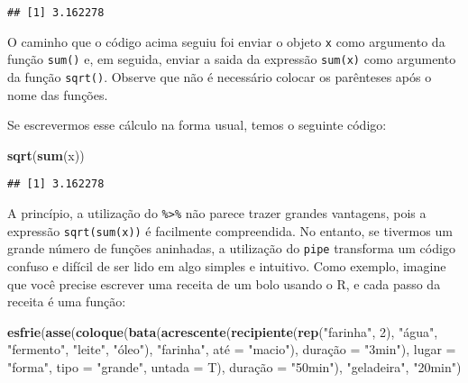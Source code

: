 \documentclass[]{book}
\newenvironment{Shaded}{\begin{snugshade}}{\end{snugshade}}
\newcommand{\KeywordTok}[1]{\textcolor[rgb]{0.13,0.29,0.53}{\textbf{{#1}}}}
\newcommand{\DataTypeTok}[1]{\textcolor[rgb]{0.13,0.29,0.53}{{#1}}}
\newcommand{\DecValTok}[1]{\textcolor[rgb]{0.00,0.00,0.81}{{#1}}}
\newcommand{\StringTok}[1]{\textcolor[rgb]{0.31,0.60,0.02}{{#1}}}
\newcommand{\NormalTok}[1]{{#1}}
\begin{document}
\begin{verbatim}
## [1] 3.162278
\end{verbatim}

O caminho que o código acima seguiu foi enviar o objeto \texttt{x} como
argumento da função \texttt{sum()} e, em seguida, enviar a saida da
expressão \texttt{sum(x)} como argumento da função \texttt{sqrt()}.
Observe que não é necessário colocar os parênteses após o nome das
funções.

Se escrevermos esse cálculo na forma usual, temos o seguinte código:

\begin{Shaded}
\begin{Highlighting}[]
\KeywordTok{sqrt}\NormalTok{(}\KeywordTok{sum}\NormalTok{(x))}
\end{Highlighting}
\end{Shaded}

\begin{verbatim}
## [1] 3.162278
\end{verbatim}

A princípio, a utilização do \texttt{\%\textgreater{}\%} não parece
trazer grandes vantagens, pois a expressão \texttt{sqrt(sum(x))} é
facilmente compreendida. No entanto, se tivermos um grande número de
funções aninhadas, a utilização do \texttt{pipe} transforma um código
confuso e difícil de ser lido em algo simples e intuitivo. Como exemplo,
imagine que você precise escrever uma receita de um bolo usando o R, e
cada passo da receita é uma função:

\begin{Shaded}
\begin{Highlighting}[]
\KeywordTok{esfrie}\NormalTok{(}\KeywordTok{asse}\NormalTok{(}\KeywordTok{coloque}\NormalTok{(}\KeywordTok{bata}\NormalTok{(}\KeywordTok{acrescente}\NormalTok{(}\KeywordTok{recipiente}\NormalTok{(}\KeywordTok{rep}\NormalTok{(}\StringTok{"farinha"}\NormalTok{, }\DecValTok{2}\NormalTok{), }\StringTok{"água"}\NormalTok{, }\StringTok{"fermento"}\NormalTok{, }\StringTok{"leite"}\NormalTok{, }\StringTok{"óleo"}\NormalTok{), }\StringTok{"farinha"}\NormalTok{, até =}\StringTok{ "macio"}\NormalTok{), duraçã}\DataTypeTok{o =} \StringTok{"3min"}\NormalTok{), }\DataTypeTok{lugar =} \StringTok{"forma"}\NormalTok{, }\DataTypeTok{tipo =} \StringTok{"grande"}\NormalTok{, }\DataTypeTok{untada =} \NormalTok{T), duraçã}\DataTypeTok{o =} \StringTok{"50min"}\NormalTok{), }\StringTok{"geladeira"}\NormalTok{, }\StringTok{"20min"}\NormalTok{)}
\end{Highlighting}
\end{Shaded}
\end{document}
